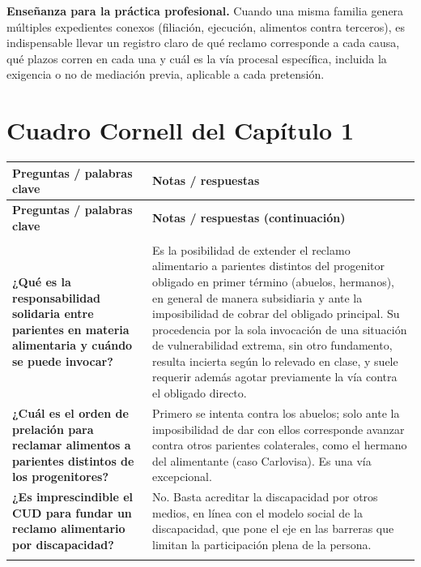 \documentclass[12pt,oneside]{book}
\begin{document}
\begin{note}
\textbf{Enseñanza para la práctica profesional.} Cuando una misma familia genera múltiples expedientes conexos (filiación, ejecución, alimentos contra terceros), es indispensable llevar un registro claro de qué reclamo corresponde a cada causa, qué plazos corren en cada una y cuál es la vía procesal específica, incluida la exigencia o no de mediación previa, aplicable a cada pretensión.
\end{note}

\section{Cuadro Cornell del Capítulo 1}

\begin{longtable}{>{\raggedright\arraybackslash}p{} >{\raggedright\arraybackslash}p{}}
\toprule
\textbf{Preguntas / palabras clave} & \textbf{Notas / respuestas} \\
\midrule
\endfirsthead
\toprule
\textbf{Preguntas / palabras clave} & \textbf{Notas / respuestas (continuación)} \\
\midrule
\endhead
\midrule
\multicolumn{2}{r}{\small\itshape continúa en la página siguiente} \\
\endfoot
\bottomrule
\endlastfoot

\textbf{¿Qué es la responsabilidad solidaria entre parientes en materia alimentaria y cuándo se puede invocar?} &
Es la posibilidad de extender el reclamo alimentario a parientes distintos del progenitor obligado en primer término (abuelos, hermanos), en general de manera subsidiaria y ante la imposibilidad de cobrar del obligado principal. Su procedencia por la sola invocación de una situación de vulnerabilidad extrema, sin otro fundamento, resulta incierta según lo relevado en clase, y suele requerir además agotar previamente la vía contra el obligado directo. \\
\addlinespace

\textbf{¿Cuál es el orden de prelación para reclamar alimentos a parientes distintos de los progenitores?} &
Primero se intenta contra los abuelos; solo ante la imposibilidad de dar con ellos corresponde avanzar contra otros parientes colaterales, como el hermano del alimentante (caso Carlovisa). Es una vía excepcional. \\
\addlinespace

\textbf{¿Es imprescindible el CUD para fundar un reclamo alimentario por discapacidad?} &
No. Basta acreditar la discapacidad por otros medios, en línea con el modelo social de la discapacidad, que pone el eje en las barreras que limitan la participación plena de la persona. \\
\addlinespace


\end{longtable}
\end{document}
